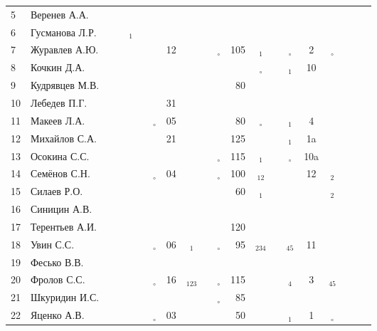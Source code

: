 \documentclass[a4paper,landscape,11pt]{article}
\newcommand*\OK{&\small \ding{51}$\!\!_\circ$} %
\newcommand*\Ok{&\small \ding{51}$\!\!_\circ$} %
\newcommand*\ok{&{\small \ding{51}}} %
\newcommand*\no{&{\small }} %
\newcommand*\da{&{\small\ding{48}$\!\!_1$}} %
\newcommand*\ab{&{\small\ding{48}$\!\!_{12}$}} %
\newcommand*\dabc{&{\small\ding{48}$\!\!_{123}$}} %
\newcommand*\db{&{\small\ding{48}$\!\!_2$}} %
\newcommand*\dd{&{\small\ding{48}$\!\!_4$}} %
\newcommand*\bd{&{\small\ding{48}$\!\!_{234}$}} %
\newcommand*\de{&{\small\ding{48}$\!\!_{45}$}} %
\begin{document}
\begin{tabular}{l|l|cccccccccrcccccccc}
 5&Веренев А.А.    \no\no\no\no\ok\no\no  \ok\ok \no\no\no\no \no\ok\no&&\\
 6&Гусманова Л.Р.  \ok\ok\da\ok\no\no\no  \no\no \no\no\no\no \no\no\no&&\\
 7&Журавлев А.Ю.   \no\no\no\no\ok&12\ok  \ok\OK&105\da\ok\Ok&  2\Ok\ok&&\\
 8&Кочкин Д.А.     \no\no\no\no\ok\ok\no  \ok\no \no\Ok\no\da& 10\no\no&&\\
 9&Кудрявцев М.В.  \no\no\ok\ok\no\no\no  \ok\ok& 80\ok\ok\no \no\no\no&&\\
10&Лебедев П.Г.    \ok\ok\no\ok\ok&31\no  \ok\no \no\no\no\no \no\no\ok&&\\
11&Макеев Л.А.     \ok\ok\ok\ok\OK&05\ok  \ok\ok& 80\Ok\ok\da&  4\ok\ok&&\\
12&Михайлов С.А.   \no\no\ok\ok\ok&21\no  \ok\ok&125\ok\ok\da& 1a\ok\ok&&\\
13&Осокина С.С.    \ok\ok\ok\ok\no\no\ok  \ok\OK&115\da\no\Ok&10a\ok\no&&\\
14&Семёнов С.Н.    \ok\ok\ok\ok\OK&04\ok  \ok\OK&100\ab\ok\ok& 12\db\no&&\\
15&Силаев Р.О.     \ok\ok\no\no\no\no\no  \no\ok& 60\da\ok\no \no\db\no&&\\
16&Синицин А.В.    \ok\ok\no\ok\no\no\no  \no\no \no\no\no\no \no\no\no&\\
17&Терентьев А.И.  \ok\ok\ok\ok\no\no\no  \no\ok&120\no\no\no \no\no\no&&\\
18&Увин С.С.       \ok\ok\ok\ok\OK&06\da  \ok\OK& 95\bd\ok\de& 11\ok\ok&&\\
19&Фесько В.В.     \no\no\no\no\no\no\no  \no\no \no\no\no\no \no\no\no&&\\
20&Фролов С.С.     \ok\ok\ok\ok\OK&16\dabc\ok\OK&115\ok\ok\dd&  3\de\ok&&\\ 
21&Шкуридин И.С.   \ok\ok\ok\ok\ok\no\ok  \ok\OK& 85\ok\ok\no \no\ok\no&&\\
22&Яценко А.В.     \ok\ok\ok\ok\OK&03\ok  \ok\ok& 50\ok\ok\da&  1\Ok\no&&\\ 
\bottomrule
\end{tabular} 
\newpage
\end{document}
